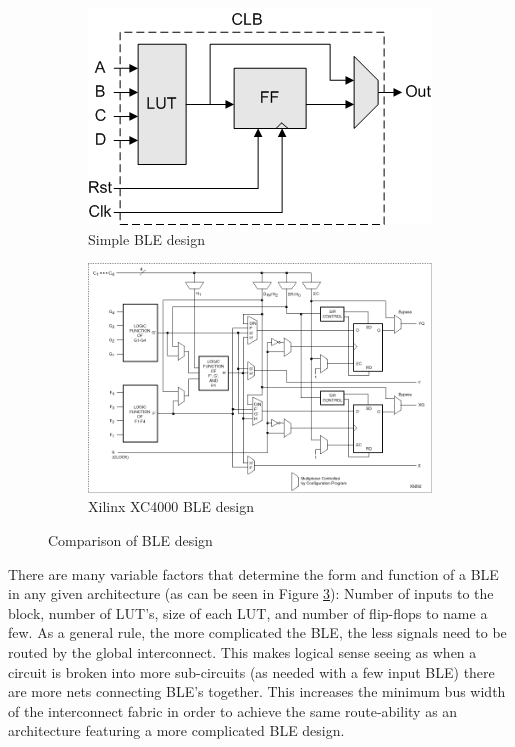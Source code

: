 \documentclass[12pt]{article}
\begin{document}
\begin{figure}[ht]
\centering
\begin{subfigure}{.5\textwidth}
    \centering
    \includegraphics[width=.95\textwidth]{simple_ble}
    \caption{Simple BLE design \cite{simple_ble}}
    \label{fig:simple_ble}
\end{subfigure}%
\begin{subfigure}{.5\textwidth}
  \centering
  \includegraphics[width=.95\textwidth]{complex_ble}
  \caption{Xilinx XC4000 BLE design \cite{xilinx_xc4000}}
  \label{fig:complex_ble}
\end{subfigure}
\caption{Comparison of BLE design}
\label{fig:compare_ble}
\end{figure}

There are many variable factors that determine the form and function of a BLE in 
any given architecture (as can be seen in Figure \ref{fig:compare_ble}): Number of inputs to the block, number of LUT’s, size of each 
LUT, and number of flip-flops to name a few. As a general rule, the more complicated 
the BLE, the less signals need to be routed by the global interconnect. This makes 
logical sense seeing as when a circuit is broken into more sub-circuits (as needed 
with a few input BLE) there are more nets connecting BLE’s together. This increases 
the minimum bus width of the interconnect fabric in order to achieve the same route-ability 
as an architecture featuring a more complicated BLE design.
\end{document}
